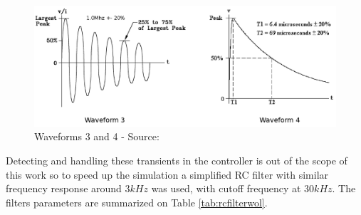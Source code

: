 \documentclass[conference]{IEEEtran}
\begin{document}
\begin{figure}[h!]
\centering
\includegraphics[scale=0.18]{pics/theory/waveforms.png}
\caption{Waveforms 3 and 4 - Source: \cite{do160}}
\label{fig:dowaveform34}
\end{figure}



Detecting and handling these transients in the controller is out of the scope of this work so to speed up the simulation a simplified RC filter with similar frequency response around $3kHz$ was used, with cutoff frequency at $30kHz$. The filters parameters are summarized on Table \ref{tab:rcfilterwol}.


\end{document}
